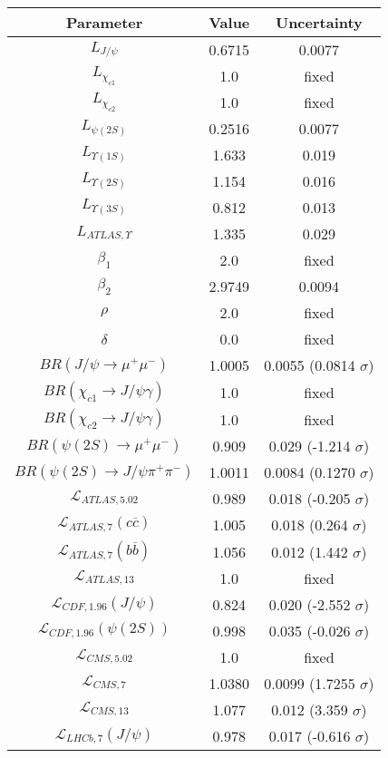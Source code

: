 \begin{table}[h!]
\centering
\begin{tabular}{c|c|c}
Parameter & Value & Uncertainty \\
\hline
$L_{J/\psi}$ & 0.6715 & 0.0077 \\
$L_{\chi_{c1}}$ & 1.0 & fixed \\
$L_{\chi_{c2}}$ & 1.0 & fixed \\
$L_{\psi(2S)}$ & 0.2516 & 0.0077 \\
$L_{\Upsilon(1S)}$ & 1.633 & 0.019 \\
$L_{\Upsilon(2S)}$ & 1.154 & 0.016 \\
$L_{\Upsilon(3S)}$ & 0.812 & 0.013 \\
$L_{ATLAS,\Upsilon}$ & 1.335 & 0.029 \\
$\beta_1$ & 2.0 & fixed \\
$\beta_2$ & 2.9749 & 0.0094 \\
$\rho$ & 2.0 & fixed \\
$\delta$ & 0.0 & fixed \\
$BR(J/\psi\rightarrow\mu^+\mu^-)$ & 1.0005 & 0.0055 (0.0814 $\sigma$) \\
$BR(\chi_{c1}\rightarrow J/\psi\gamma)$ & 1.0 & fixed \\
$BR(\chi_{c2}\rightarrow J/\psi\gamma)$ & 1.0 & fixed \\
$BR(\psi(2S)\rightarrow\mu^+\mu^-)$ & 0.909 & 0.029 (-1.214 $\sigma$) \\
$BR(\psi(2S)\rightarrow J/\psi\pi^+\pi^-)$ & 1.0011 & 0.0084 (0.1270 $\sigma$) \\
$\mathcal L_{ATLAS,5.02}$ & 0.989 & 0.018 (-0.205 $\sigma$) \\
$\mathcal L_{ATLAS,7}(c\overline c)$ & 1.005 & 0.018 (0.264 $\sigma$) \\
$\mathcal L_{ATLAS,7}(b\overline b)$ & 1.056 & 0.012 (1.442 $\sigma$) \\
$\mathcal L_{ATLAS,13}$ & 1.0 & fixed \\
$\mathcal L_{CDF,1.96}(J/\psi)$ & 0.824 & 0.020 (-2.552 $\sigma$) \\
$\mathcal L_{CDF,1.96}(\psi(2S))$ & 0.998 & 0.035 (-0.026 $\sigma$) \\
$\mathcal L_{CMS,5.02}$ & 1.0 & fixed \\
$\mathcal L_{CMS,7}$ & 1.0380 & 0.0099 (1.7255 $\sigma$) \\
$\mathcal L_{CMS,13}$ & 1.077 & 0.012 (3.359 $\sigma$) \\
$\mathcal L_{LHCb,7}(J/\psi)$ & 0.978 & 0.017 (-0.616 $\sigma$) \\

\end{tabular}
\end{table}
